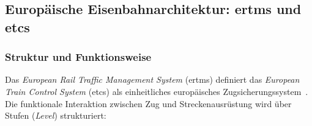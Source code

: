 \documentclass[runningheads]{res/llncs}
\begin{document}
\subsection{\texorpdfstring{Europäische Eisenbahnarchitektur: \gls{ertms} und \gls{etcs}}{Europäische Eisenbahnarchitektur: ERTMS und ETCS}}
\label{sec:Europäische_Eisenbahnarchitektur_ERTMS_und_ETCS}

\subsubsection{Struktur und Funktionsweise}
\label{sec:Struktur_und_Funktionsweise}
Das \textit{European Rail Traffic Management System} (\gls{ertms}) definiert das \textit{European Train Control System} (\gls{etcs}) als einheitliches europäisches Zugsicherungssystem~\parencite[S. 49]{trinckaufETCS2024}. Die funktionale Interaktion zwischen Zug und Streckenausrüstung wird über Stufen (\textit{Level}) strukturiert:
\end{document}
